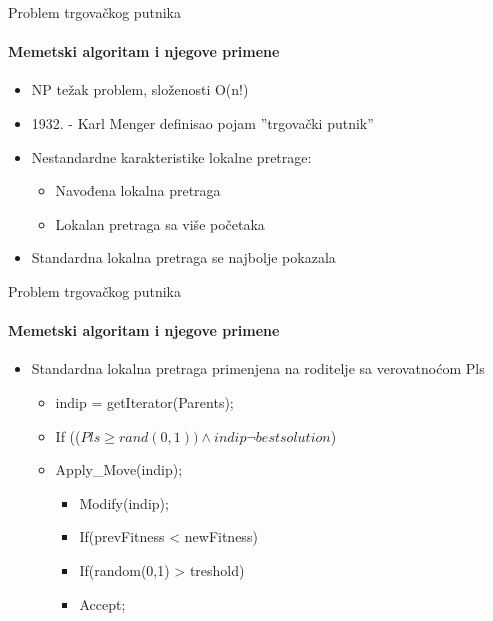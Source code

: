 \documentclass{beamer}
\begin{document}
\begin{frame}[fragile]{Problem trgovačkog putnika}
  \framesubtitle{Memetski algoritam i njegove primene}
  
   \begin{itemize}
    \item{NP težak problem, složenosti O(n!)}
    \item{1932. - Karl Menger definisao pojam ''trgovački putnik'' }
     \item{Nestandardne karakteristike lokalne pretrage:}
        \begin{itemize}
             \item{Navođena lokalna pretraga}
             \item{Lokalan pretraga sa više početaka}
        \end{itemize}
     \item{Standardna lokalna pretraga se najbolje pokazala}
  \end{itemize}

\end{frame}


\begin{frame}[fragile]{Problem trgovačkog putnika}
  \framesubtitle{Memetski algoritam i njegove primene}
  
   \begin{itemize}
    \item{Standardna lokalna pretraga primenjena na roditelje sa verovatnoćom Pls}
  \begin{itemize}
    \item{indip = getIterator(Parents);}
     
    \item{If (($Pls \geqslant	 rand(0,1)) \wedge indip \neg best solution$)}
    \item{Apply\_Move(indip);}
     \begin{itemize}
       \item{Modify(indip);}
        \item{If(prevFitness < newFitness)}
        \item{If(random(0,1) > treshold)}
        \item{Accept;}
        \end{itemize}
   \end{itemize}
  \end{itemize}

\end{frame}
\end{document}
